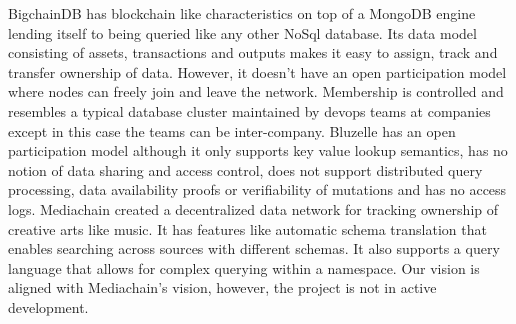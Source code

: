 BigchainDB \cite{bigchaindb} has blockchain like characteristics on top of a MongoDB engine lending itself to being queried like any other NoSql database. Its data model consisting of assets, transactions and outputs makes it easy to assign, track and transfer ownership of data. However, it doesn't have an open participation model where nodes can freely join and leave the network. Membership is controlled and resembles a typical database cluster maintained by devops teams at companies except in this case the teams can be inter-company. Bluzelle \cite{bluzelle} has an open participation model although it only supports key value lookup semantics, has no notion of data sharing and access control, does not support distributed query processing, data availability proofs or verifiability of mutations and has no access logs. Mediachain \cite{mediachain} created a decentralized data network for tracking ownership of creative arts like music. It has features like automatic schema translation that enables searching across sources with different schemas. It also supports a query language that allows for complex querying within a namespace. Our vision is aligned with Mediachain's vision, however, the project is not in active development.


